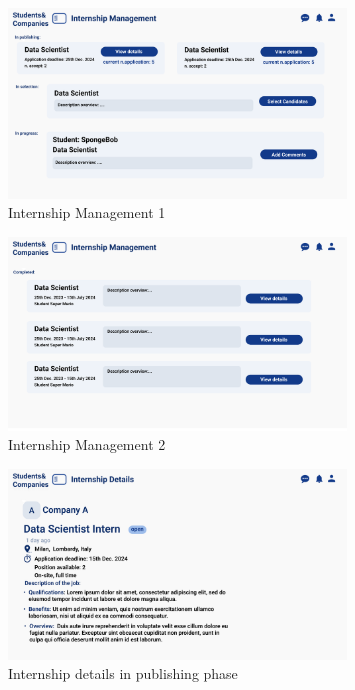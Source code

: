 \begin{figure}[H]
    \centering
    \includegraphics[width=0.8\textwidth]{Images/UI/Internship Management-company.png}
    \caption{Internship Management 1}\label{fig:Internship Management 1}
\end{figure}

\begin{figure}[H]
    \centering
    \includegraphics[width=0.8\textwidth]{Images/UI/Internship Management2-company.png}
    \caption{Internship Management 2}\label{fig:Internship Management 2}
\end{figure}

\begin{figure}[H]
    \centering
    \includegraphics[width=0.8\textwidth]{Images/UI/Internship details-company view.png}
    \caption{Internship details in publishing phase}\label{fig:Internship details in publishing phase}
\end{figure}

